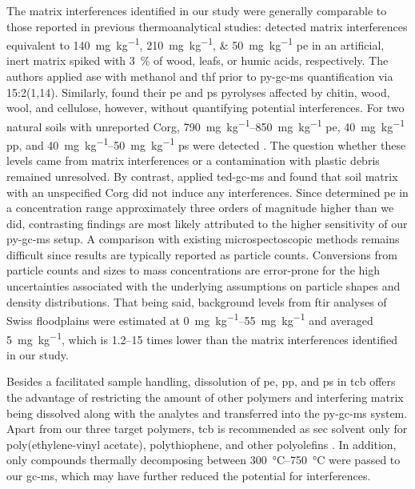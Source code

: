 The matrix interferences identified in our study were generally comparable to those reported in previous thermoanalytical studies: \citet{DierkesQuantification2019} detected matrix interferences equivalent to \SIlist{140;210;50}{\milli\gram\per\kilo\gram} \ac{pe} in an artificial, inert matrix spiked with \SI{3}{\percent} of wood, leafs, or humic acids, respectively. The authors applied \ac{ase} with methanol and \ac{thf} prior to \ac{py-gc-ms} quantification via 15:2(1,14). Similarly, \citet{FischerSimultaneous2017} found their \ac{pe} and \ac{ps} pyrolyses affected by chitin, wood, wool, and cellulose, however, without quantifying potential interferences. For two natural soils with unreported \ac{Corg}, \SIrange{790}{850}{\milli\gram\per\kilo\gram} \ac{pe}, \SI{40}{\milli\gram\per\kilo\gram} \ac{pp}, and \SIrange{40}{50}{\milli\gram\per\kilo\gram} \ac{ps} were detected \citep{DierkesQuantification2019}. The question whether these levels came from matrix interferences or a contamination with plastic debris remained unresolved. By contrast, \citet{DumichenAnalysis2015} applied \ac{ted-gc-ms} and found that soil matrix with an unspecified \ac{Corg} did not induce any interferences. Since \citet{DumichenAnalysis2015,DumichenFast2017} determined \ac{pe} in a concentration range approximately three orders of magnitude higher than we did, contrasting findings are most likely attributed to the higher sensitivity of our \ac{py-gc-ms} setup. A comparison with existing microspectoscopic methods \citep{ScheurerMicroplastics2018,PiehlIdentification2018} remains difficult since results are typically reported as particle counts. Conversions from particle counts and sizes to mass concentrations are error-prone for the high uncertainties associated with the underlying assumptions on particle shapes and density distributions. That being said, background levels from \ac{ftir} analyses of Swiss floodplains were estimated at \SIrange{0}{55}{\milli\gram\per\kilo\gram} and averaged \SI{5}{\milli\gram\per\kilo\gram}, which is \numrange{1.2}{15} times lower than the matrix interferences identified in our study.

Besides a facilitated sample handling, dissolution of \ac{pe}, \ac{pp}, and \ac{ps} in \ac{tcb} offers the advantage of restricting the amount of other polymers and interfering matrix being dissolved along with the analytes and transferred into the \ac{py-gc-ms} system. Apart from our three target polymers, \ac{tcb} is recommended as \ac{sec} solvent only for poly(ethylene-vinyl acetate), polythiophene, and other polyolefins \citep{BivensPolymertoSolvent2016}. In addition, only compounds thermally decomposing between \SIrange[range-phrase = { and }]{300}{750}{\degreeCelsius} were passed to our \ac{gc-ms}, which may have further reduced the potential for interferences.

